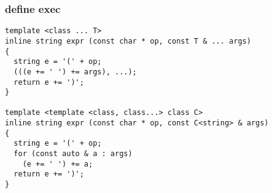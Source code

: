 \subsubsection{define exec}

\begin{algorithm}[H]
\end{algorithm}

\begin{algorithm}[H]
\end{algorithm}

\begin{algorithm}[H]
\end{algorithm}

\begin{algorithm}[H]
\end{algorithm}

\begin{algorithm}[H]
\end{algorithm}

\begin{lstlisting}[style=c++]
template <class ... T>
inline string expr (const char * op, const T & ... args)
{
  string e = '(' + op;
  (((e += ' ') += args), ...);
  return e += ')';
}

template <template <class, class...> class C>
inline string expr (const char * op, const C<string> & args)
{
  string e = '(' + op;
  for (const auto & a : args)
    (e += ' ') += a;
  return e += ')';
}
\end{lstlisting}

